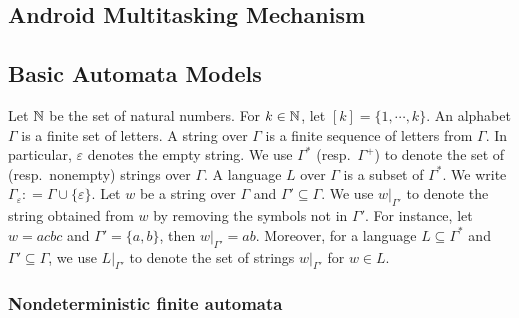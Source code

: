 
\subsection{Android Multitasking Mechanism} \label{sec:amm}


\subsection{Basic Automata Models}

Let ${\mathbb{N} }$ be the set of natural numbers. For $k \in {\mathbb{N} }$, let $[k]=\{1,\cdots, k\}$. 
%
An alphabet $\Gamma$ is a finite set of letters.  A string over $\Gamma$ is a finite sequence of letters from $\Gamma$. In particular, $\varepsilon$ denotes %
the empty string. We use $\Gamma^*$ (resp.\ $\Gamma^+$) to denote the set of (resp.\ nonempty) strings over $\Gamma$. A language $L$ over $\Gamma$ is a  subset of $\Gamma^*$. We write $\Gamma_\varepsilon: = \Gamma \cup \{\varepsilon\}$. Let $w$ be a string over $\Gamma$ and $\Gamma' \subseteq \Gamma$. We use $w |_{\Gamma'}$ to denote the string obtained from $w$ by removing the symbols not in $\Gamma'$. For instance, let $w = a  c b c$ and $\Gamma' = \{a,b\}$, then $w|_{\Gamma'} = ab$. Moreover, for a language $L \subseteq \Gamma^*$ and $\Gamma' \subseteq \Gamma$, we use $L|_{\Gamma'}$ to denote the set of strings $w |_{\Gamma'}$ for $w \in L$. 
 
\subsubsection{Nondeterministic finite automata}


